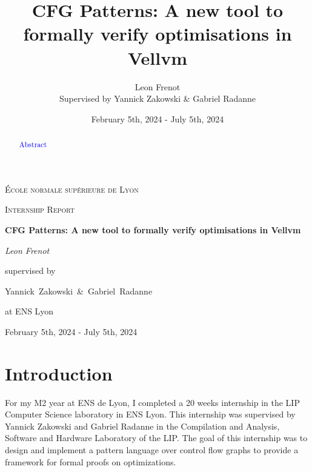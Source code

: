 \documentclass[11pt]{article}
\newcommand{\leon}[1]{\textcolor{blue}{#1}}
\begin{document}
\title{CFG Patterns: A new tool to formally verify optimisations in Vellvm}

\author{Leon Frenot\\ Supervised by Yannick Zakowski \& Gabriel Radanne}

\date{February 5th, 2024 - July 5th, 2024}

\begin{titlepage}
  \centering
  {\textsc{École normale supérieure de Lyon} \par}
  \vspace{1cm}
  {\Large \textsc{Internship Report}\par}
  \vspace{1.5cm}
  {\huge\bfseries CFG Patterns: A new tool to formally verify optimisations in Vellvm\par}
  \vspace{2cm}
  {\Large\itshape Leon Frenot\par}
  \vfill
  supervised by\par
  Yannick~Zakowski~\&~Gabriel~Radanne\par
  at ENS Lyon
  \vfill

  {\large February 5th, 2024 - July 5th, 2024\par}
\end{titlepage}

\tableofcontents
\newpage

\hypersetup{colorlinks=true, linkcolor=red}

\begin{abstract}
  \leon{Abstract}
\end{abstract}

\section{Introduction}
\label{sec:intro}

\indent
For my M2 year at ENS de Lyon, I completed a 20 weeks internship in the LIP Computer Science laboratory in ENS Lyon. This internship was supervised by Yannick Zakowski and Gabriel Radanne in the Compilation and Analysis, Software and Hardware Laboratory of the LIP. The goal of this internship was to design and implement a pattern language over control flow graphs to provide a framework for formal proofs on optimizations.



\end{document}
